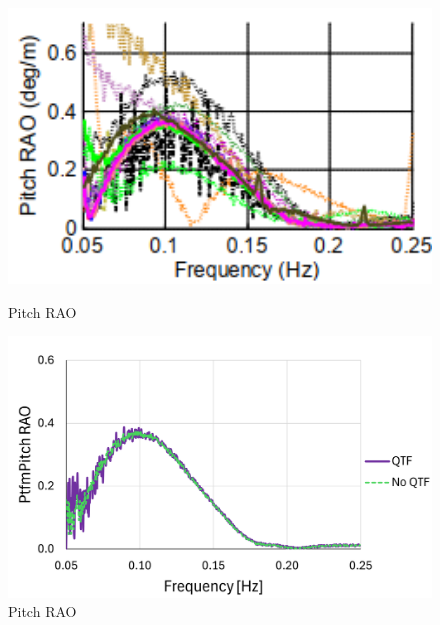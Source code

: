 \documentclass[a4paper, 11pt]{article}
\begin{document}
\begin{figure}[H]
    \begin{minipage}{0.48\textwidth}
        \centering
        \includegraphics[width=1\textwidth]{2.6_pitch.png}
        \caption{\small Pitch RAO \cite{Robertson2014}}
        \label{fig:2.6_pitch}
    \end{minipage}
    \hfill
    \begin{minipage}{0.5\textwidth}
        \centering
        \includegraphics[width=1\textwidth]{2.6_pitch_mine.png}
        \caption{\small Pitch RAO}
        \label{fig:2.6_pitch_mine}
    \end{minipage}
\end{figure}
\end{document}
